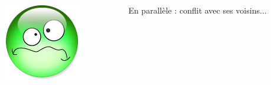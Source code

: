 \documentclass[xcolor={x11names,svgnames}]{beamer}
\begin{document}
\begin{frame}[label=sparse_lu_MIS_3]
  \begin{columns}[c]
    \begin{column}{.1\textwidth}
      \includegraphics[width=\textwidth]{triste.png}
    \end{column}
    \begin{column}[c]{.9\textwidth}

      En parallèle : conflit avec ses voisins...
      
    \end{column}
  \end{columns}
\end{frame}

\end{document}
